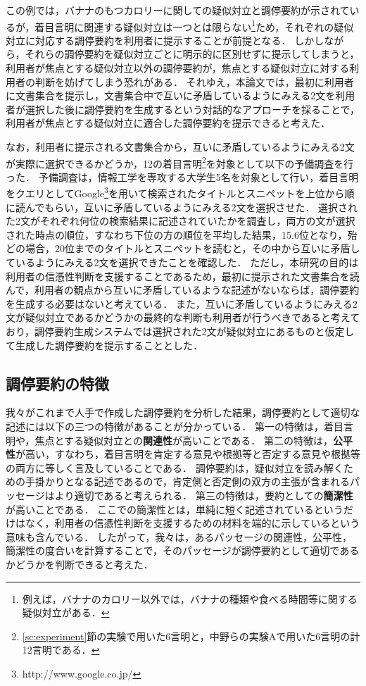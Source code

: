 \documentclass[japanese]{jnlp_1.4}
\begin{document}
この例では，バナナのもつカロリーに関しての疑似対立と調停要約が示されているが，着目言明に関連する疑似対立は一つとは限らない\footnote{例えば，バナナのカロリー以外では，バナナの種類や食べる時間等に関する疑似対立がある．}ため，それぞれの疑似対立に対応する調停要約を利用者に提示することが前提となる．
しかしながら，それらの調停要約を疑似対立ごとに明示的に区別せずに提示してしまうと，利用者が焦点とする疑似対立以外の調停要約が，焦点とする疑似対立に対する利用者の判断を妨げてしまう恐れがある．
それゆえ，本論文では，最初に利用者に文書集合を提示し，文書集合中で互いに矛盾しているようにみえる2文を利用者が選択した後に調停要約を生成するという対話的なアプローチを採ることで，利用者が焦点とする疑似対立に適合した調停要約を提示できると考えた．

なお，利用者に提示される文書集合から，互いに矛盾しているようにみえる2文が実際に選択できるかどうか，12の着目言明\footnote{\ref{sc:experiment}節の実験で用いた6言明と，中野ら\cite{Nakano2011}の実験Aで用いた6言明の計12言明である．}を対象として以下の予備調査を行った．
予備調査は，情報工学を専攻する大学生5名を対象として行い，着目言明をクエリとしてGoogle\footnote{http://www.google.co.jp/}を用いて検索されたタイトルとスニペットを上位から順に読んでもらい，互いに矛盾しているようにみえる2文を選択させた．
選択された2文がそれぞれ何位の検索結果に記述されていたかを調査し，両方の文が選択された時点の順位，すなわち下位の方の順位を平均した結果，15.6位となり，殆どの場合，20位までのタイトルとスニペットを読むと，その中から互いに矛盾しているようにみえる2文を選択できたことを確認した．
ただし，本研究の目的は利用者の信憑性判断を支援することであるため，最初に提示された文書集合を読んで，利用者の観点から互いに矛盾しているような記述がないならば，調停要約を生成する必要はないと考えている．
また，互いに矛盾しているようにみえる2文が疑似対立であるかどうかの最終的な判断も利用者が行うべきであると考えており，調停要約生成システムでは選択された2文が疑似対立にあるものと仮定して生成した調停要約を提示することとした．


\subsection{調停要約の特徴}
\label{ssc:feature}

我々がこれまで人手で作成した調停要約を分析した結果，調停要約として適切な記述には以下の三つの特徴があることが分かっている．
第一の特徴は，着目言明や，焦点とする疑似対立との{\bf 関連性}が高いことである．
第二の特徴は，{\bf 公平性}が高い，すなわち，着目言明を肯定する意見や根拠等と否定する意見や根拠等の両方に等しく言及していることである．
調停要約は，疑似対立を読み解くための手掛かりとなる記述であるので，肯定側と否定側の双方の主張が含まれるパッセージはより適切であると考えられる．
第三の特徴は，要約としての{\bf 簡潔性}が高いことである．
ここでの簡潔性とは，単純に短く記述されているというだけはなく，利用者の信憑性判断を支援するための材料を端的に示しているという意味も含んでいる．
したがって，我々は，あるパッセージの関連性，公平性，簡潔性の度合いを計算することで，そのパッセージが調停要約として適切であるかどうかを判断できると考えた．
\end{document}

